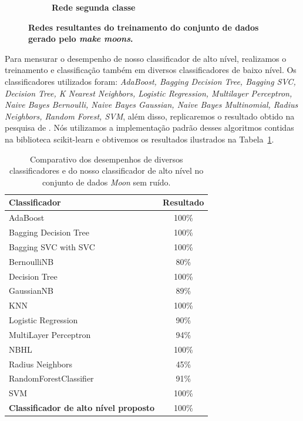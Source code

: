 \documentclass[
12pt,        %
oneside,     %
a4paper,     %
english,       %
brazil        %
%
%
]{ppgca}
\begin{document}
\begin{figure}[H]
\begin{subfigure}[b]{0.49\textwidth}
        \centering
        \caption{\textbf{{Rede segunda classe}}}
        \label{fig:moons1}
    \end{subfigure}
    \caption{\textbf{{Redes resultantes do treinamento do conjunto de dados gerado pelo \textit{make moons}.}}}
    \label{fig:moons}
\end{figure}

Para mensurar o desempenho de nosso classificador de alto nível, realizamos o treinamento e classificação também em diversos classificadores de baixo nível. Os classificadores utilizados foram: \textit{AdaBoost, Bagging Decision Tree, Bagging SVC, Decision Tree, K Nearest Neighbors, Logistic Regression, Multilayer Perceptron, Naive Bayes Bernoulli, Naive Bayes Gaussian, Naive Bayes Multinomial, Radius Neighbors, Random Forest, SVM}, além disso, replicaremos o resultado obtido na pesquisa de \cite{Colliri2018}. Nós utilizamos a implementação padrão desses algoritmos contidas na biblioteca scikit-learn \cite{scikit-learn} e obtivemos os resultados ilustrados na Tabela~\ref{tab:resultadomoon1}.

\begin{table}[ht]
\caption{Comparativo dos desempenhos de diversos classificadores e do nosso classificador de alto nível no conjunto de dados \textit{Moon} sem ruído.}
\label{tab:resultadomoon1}
  \centering
\begin{tabular}{l|c}\hline
 Classificador & Resultado\\\hline
AdaBoost & 100\% \\ 
Bagging Decision Tree & 100\% \\ 
Bagging SVC with SVC & 100\% \\ 
BernoulliNB & 80\% \\
Decision Tree & 100\% \\
GaussianNB & 89\% \\ 
KNN & 100\% \\ 
Logistic Regression & 90\% \\
MultiLayer Perceptron & 94\% \\ 
NBHL \cite{Colliri2018} & 100\% \\
Radius Neighbors & 45\% \\
RandomForestClassifier & 91\% \\ 
SVM & 100\% \\
\textbf{Classificador de alto nível proposto} & 100\% \\\hline
\end{tabular}
\end{table}
\end{document}
